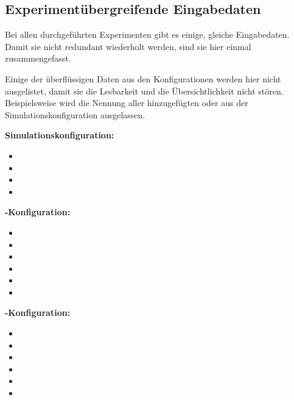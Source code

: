 %

\subsection{Experimentübergreifende Eingabedaten}\label{subsec:input-data}

Bei allen durchgeführten Experimenten gibt es einige, gleiche Eingabedaten.
Damit sie nicht redundant wiederholt werden, sind sie hier einmal zusammengefasst.

Einige der überflüssigen Daten aus den Konfigurationen werden hier nicht ausgelistet, damit sie die Lesbarkeit und die Übersichtlichkeit nicht stören.
Beispielsweise wird die Nennung aller hinzugefügten  oder  aus der Simulationskonfiguration ausgelassen.

\textbf{Simulationskonfiguration:}
\begin{itemize}
    \item {}
    \item {}
    \item {}
    \item {}
\end{itemize}

\textbf{-Konfiguration:}
\begin{itemize}
    \item {}
    \item {}
    \item {}
    \item {}
    \item {}
    \item {}
\end{itemize}

\textbf{-Konfiguration:}
\begin{itemize}
    \item {}
    \item {}
    \item {}
    \item {}
    \item {}
    \item {}
\end{itemize}

